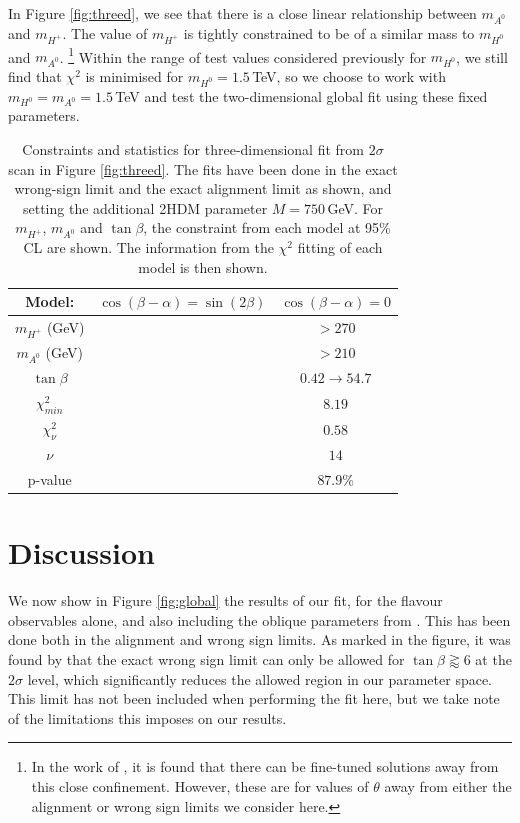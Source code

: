 \documentclass[a4paper,12pt]{article}
\begin{document}
In Figure \ref{fig:threed}, we see that there is a close linear relationship between $m_{A^0}$ and $m_{H^+}$. 
The value of $m_{H^+}$ is tightly constrained to be of a similar mass to $m_{H^0}$ and $m_{A^0}$. 
\hspace{-8pt}\footnote{In the work of \cite{james}, it is found that there can be fine-tuned solutions away from this close confinement. However, these are for values of $\theta$ away from either the alignment or wrong sign limits we consider here.}
\hspace{-3pt}Within the range of test values considered previously for $m_{H^0}$, we still find that $\chi^2$ is minimised for $m_{H^0}=1.5\,$TeV, so we choose to work with $m_{H^0}=m_{A^0}=1.5\,$TeV and test the two-dimensional global fit using these fixed parameters. 
\begin{table}[ht]
    \centering
    \begin{tabular}{c|c|c}
        \hline\hline
        \textbf{Model:} & $\cos(\beta-\alpha)=\sin(2\beta)$ & $\cos(\beta-\alpha)=0$ \\ 
        \hline\hline
        $m_{H^+}$ (GeV) & & $>270$ \\
        $m_{A^0}$ (GeV) & & $>210$ \\
        $\tan\beta$ & & $0.42\to54.7$ \\
        \hline
        $\chi^2_{min}$ & & $8.19$ \\
        $\chi^2_\nu$ & & $0.58$ \\
        $\nu$ & & $14$ \\
        p-value & & $87.9\%$ \\
        \hline\hline
    \end{tabular}
    \caption{\label{tab:pthreed}Constraints and statistics for three-dimensional fit from $2\sigma$ scan in Figure \ref{fig:threed}. 
    The fits have been done in the exact wrong-sign limit and the exact alignment limit as shown, and setting the additional 2HDM parameter $M=750\,$GeV. 
    For $m_{H^+}$, $m_{A^0}$ and $\tan\beta$, the constraint from each model at 95\% CL are shown.
    The information from the $\chi^2$ fitting of each model is then shown.}
    \vspace{-20pt}
\end{table}

\section{Discussion}
\label{sec:discuss}
We now show in Figure \ref{fig:global} the results of our fit, for the flavour observables alone, and also including the oblique parameters from \cite{james}.
This has been done both in the alignment and wrong sign limits. 
As marked in the figure, it was found by \cite{oliver} that the exact wrong sign limit can only be allowed for $\tan\beta\gtrapprox6$ at the $2\sigma$ level, which significantly reduces the allowed region in our parameter space. 
This limit has not been included when performing the fit here, but we take note of the limitations this imposes on our results.
\end{document}
